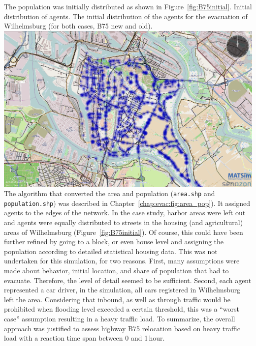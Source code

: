The population was initially distributed as shown in Figure~\ref{fig:B75initial}. 
%
\createfigure%
{Initial distribution of agents.}%
{The initial distribution of the agents for the evacuation of Wilhelmsburg (for both cases, B75 new and old).}%
{\label{fig:B75initial}}%
{\includegraphics[width=0.7\linewidth]{using/figures/B75initial}}%
{}
The algorithm that converted the area and population (\ie \lstinline|area.shp| and \lstinline|population.shp|) was described in Chapter~\ref{chap:evac:fig:area_pop}). It assigned agents to the edges of the network. In the case study, harbor areas were left out and agents were equally distributed to streets in the housing (and agricultural) areas of Wilhelmsburg (Figure~\ref{fig:B75initial}).
Of course, this could have been further refined by going to a block, or even house level and assigning the population according to detailed statistical housing data. This was not undertaken for this simulation, for two reasons. First, many assumptions were made about behavior, initial location, and share of population that had to evacuate. Therefore, the level of detail seemed to be sufficient. Second, each agent represented a car driver, \ie in the simulation, all cars registered in Wilhelmsburg left the area. Considering that inbound, as well as through traffic would be prohibited when flooding level exceeded a certain threshold, this was a ``worst case'' assumption resulting in a heavy traffic load. To summarize, the overall approach was justified to assess highway B75 relocation based on heavy traffic load with a reaction time span between 0 and 1\,hour.

